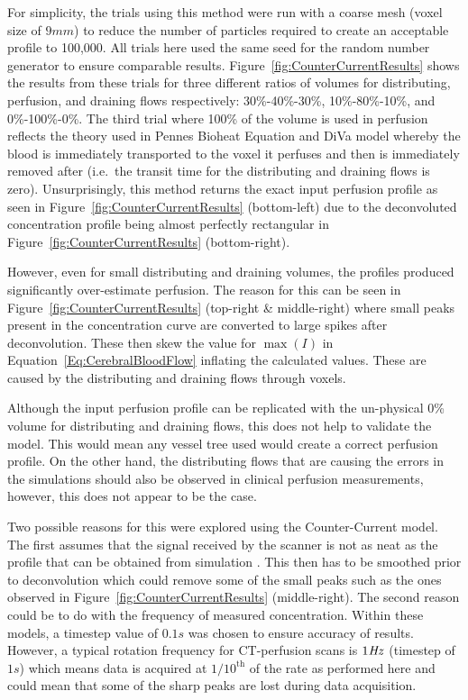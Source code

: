 \documentclass[11pt,english,a4paper,twoside,openright]{report}
\newcommand\Hertz{\mbox{\textit{Hz}}}
\begin{document}
{{{{{{{For simplicity, the trials using this method were run with a coarse mesh (voxel size of $9mm$) to reduce the number of particles required to create an acceptable profile to 100,000. All trials here used the same seed for the random number generator to ensure comparable results. Figure~\ref{fig:CounterCurrentResults} shows the results from these trials for three different ratios of volumes for distributing, perfusion, and draining flows respectively: 30\%-40\%-30\%, 10\%-80\%-10\%, and 0\%-100\%-0\%. The third trial where 100\% of the volume is used in perfusion reflects the theory used in Pennes Bioheat Equation and DiVa model whereby the blood is immediately transported to the voxel it perfuses and then is immediately removed after (i.e.\ the transit time for the distributing and draining flows is zero). Unsurprisingly, this method returns the exact input perfusion profile as seen in Figure~\ref{fig:CounterCurrentResults} (bottom-left) due to the deconvoluted concentration profile being almost perfectly rectangular in Figure~\ref{fig:CounterCurrentResults} (bottom-right). 

However, even for small distributing and draining volumes, the profiles produced significantly over-estimate perfusion. The reason for this can be seen in Figure~\ref{fig:CounterCurrentResults} (top-right \& middle-right) where small peaks present in the concentration curve are converted to large spikes after deconvolution. These then skew the value for $\max(I)$ in Equation~\ref{Eq:CerebralBloodFlow} inflating the calculated values. These are caused by the distributing and draining flows through voxels.

Although the input perfusion profile can be replicated with the un-physical 0\% volume for distributing and draining flows, this does not help to validate the model. This would mean any vessel tree used would create a correct perfusion profile. On the other hand, the distributing flows that are causing the errors in the simulations should also be observed in clinical perfusion measurements, however, this does not appear to be the case.

Two possible reasons for this were explored using the Counter-Current model. The first assumes that the signal received by the scanner is not as neat as the profile that can be obtained from simulation \cite{ostergaard1996high}. This then has to be smoothed prior to deconvolution which could remove some of the small peaks such as the ones observed in Figure~\ref{fig:CounterCurrentResults} (middle-right). The second reason could be to do with the frequency of measured concentration. Within these models, a timestep value of $0.1s$ was chosen to ensure accuracy of results. However, a typical rotation frequency for CT-perfusion scans is $1\Hertz$ (timestep of $1s$) \cite{reiser2008multislice} which means data is acquired at $1/10^{\text{th}}$ of the rate as performed here and could mean that some of the sharp peaks are lost during data acquisition. 

}}}}}}}
\end{document}
